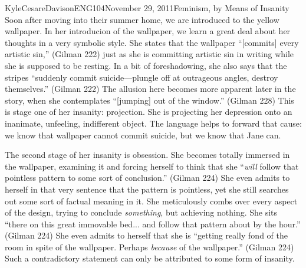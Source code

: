 \documentclass[11pt,letterpaper]{article}
\begin{document}
\begin{mla}{Kyle}{Cesare}{Davison}{ENG104}{November 29, 2011}{Feminism, by Means
of Insanity}
Soon after moving into their summer home, we are introduced to the yellow
wallpaper.  In her introducion of the wallpaper, we learn a great deal about her
thoughts in a very symbolic style.  She states that the wallpaper ``[commits]
every artistic sin,'' (Gilman 222) just as she is committing artistic sin in
writing while she is supposed to be resting.  In a bit of foreshadowing, she
also says that the stripes ``suddenly commit suicide---plungle off at outrageous
angles, destroy themselves.'' (Gilman 222)  The allusion here becomes more
apparent later in the story, when she contemplates ``[jumping] out of the
window.'' (Gilman 228)  This is stage one of her insanity: projection.  She is
projecting her depression onto an inanimate, unfeeling, indifferent object.  The
language helps to forward that cause: we know that wallpaper cannot commit
suicide, but we know that Jane can.

The second stage of her insanity is obsession.  She becomes totally immersed in
the wallpaper, examining it and forcing herself to think that she ``\emph{will}
follow that pointless pattern to some sort of conclusion.'' (Gilman 224)  She
even admits to herself in that very sentence that the pattern is pointless, yet
she still searches out some sort of factual meaning in it.  She meticulously
combs over every aspect of the design, trying to conclude \emph{something}, but
achieving nothing.  She sits ``there on this great immovable bed... and follow
that pattern about by the hour.'' (Gilman 224)  She even admits to herself that
she is ``getting really fond of the room in spite of the wallpaper.  Perhaps
\emph{because} of the wallpaper.'' (Gilman 224)  Such a contradictory statement
can only be attributed to some form of insanity.


\end{mla}
\end{document}
